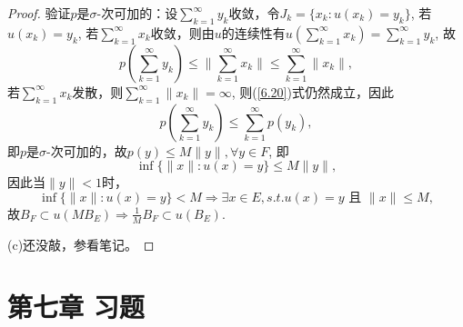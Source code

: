 \documentclass[a4paper,8pt]{ctexart}\textwidth 140mm \textheight 216mm
\newcommand{\8}{\infty}
\begin{document}
\begin{proof}
	验证$p$是$\sigma$-次可加的：设$\sum_{k=1}^\infty y_k$收敛，令$J_k=\{x_k:u(x_k)=y_k\}$, 若$u(x_k)=y_k$, 若$\sum_{k=1}^\infty x_k$收敛，则由$u$的连续性有$u(\sum_{k=1}^\infty x_k)=\sum_{k=1}^\infty y_k$, 故
	\begin{equation}\label{6.20}
	p(\sum_{k=1}^\infty y_k)\leq \|\sum_{k=1}^\infty x_k\|\leq\sum_{k=1}^\infty \|x_k\|,	
	\end{equation}
	若$\sum_{k=1}^\infty x_k$发散，则$\sum_{k=1}^\infty \|x_k\|=\infty$, 则(\ref{6.20})式仍然成立，因此
	$$p(\sum_{k=1}^\infty y_k)\leq\sum_{k=1}^\infty p(y_k),$$
	即$p$是$\sigma$-次可加的，故$p(y)\leq M\|y\|,\forall y\in F$, 即
	$$\inf\{\|x\|:u(x)=y\}\leq M\|y\|,$$
	因此当$\|y\|<1$时，
	$$\inf\{\|x\|:u(x)=y\}<M\Rightarrow \exists x\in E,s.t.u(x)=y\mbox{ 且 }\|x\|\leq M,$$
	故$B_F\subset u(MB_E)\Rightarrow\frac{1}{M}B_F\subset u(B_E)$. 
	
	(c)还没敲，参看笔记。
\end{proof}
\section{第七章 习题}







\end{document}

